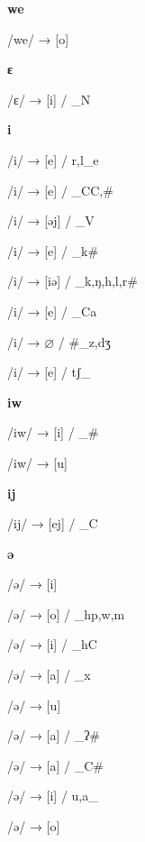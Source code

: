 \begin{center}\textbf{we}\end{center}
\begin{multicols}{4}
\noindent /we/ → [o]

\end{multicols}

\begin{center}\textbf{ɛ}\end{center}
\begin{multicols}{4}
\noindent /ɛ/ → [i] / \_N

\end{multicols}

\begin{center}\textbf{i}\end{center}
\begin{multicols}{4}
\noindent /i/ → [e] / {r,l}\_e

\noindent /i/ → [e] / \_C{C,\#}

\noindent /i/ → [əj] / \_V

\noindent /i/ → [e] / \_k\#

\noindent /i/ → [iə] / \_{k,ŋ,h,l,r}\#

\noindent /i/ → [e] / \_Ca

\noindent /i/ → $\varnothing$ / \#\_{z,dʒ}

\noindent /i/ → [e] / tʃ\_

\end{multicols}

\begin{center}\textbf{iw}\end{center}
\begin{multicols}{4}
\noindent /iw/ → [i] / \_\#

\noindent /iw/ → [u]

\end{multicols}

\begin{center}\textbf{ij}\end{center}
\begin{multicols}{4}
\noindent /ij/ → [ej] / \_C

\end{multicols}

\begin{center}\textbf{ə}\end{center}
\begin{multicols}{4}
\noindent /ə/ → [i]

\noindent /ə/ → [o] / \_h{p,w,m}

\noindent /ə/ → [i] / \_hC

\noindent /ə/ → [a] / \_x

\noindent /ə/ → [u]

\noindent /ə/ → [a] / \_ʔ\#

\noindent /ə/ → [a] / \_C\#

\noindent /ə/ → [i] / {u,a}\_

\noindent /ə/ → [o]

\end{multicols}

